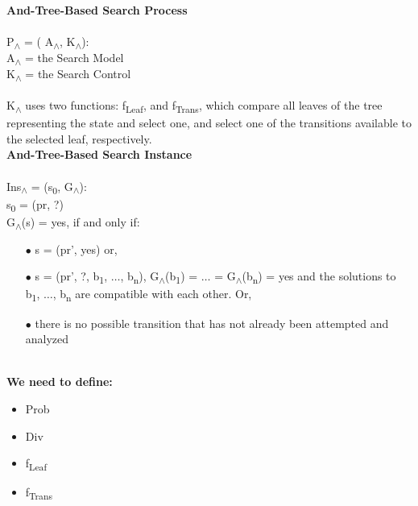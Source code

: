 \documentclass[11pt, oneside]{article}   	%
\begin{document}
\noindent \textbf{And-Tree-Based Search Process}\\\\
P\textsubscript{$\land$} = ( A\textsubscript{$\land$}, K\textsubscript{$\land$}):\\
\indent A\textsubscript{$\land$} = the Search Model\\
\indent K\textsubscript{$\land$} = the Search Control\\\\
\noindent K\textsubscript{$\land$} uses two functions: f\textsubscript{Leaf}, and f\textsubscript{Trans}, which compare all leaves of the tree representing the state and select one, and select one of the transitions available to the selected leaf, respectively.\\

\noindent \textbf{And-Tree-Based Search Instance}\\\\
Ins\textsubscript{$\land$} = (s\textsubscript{0}, G\textsubscript{$\land$}):\\
\indent s\textsubscript{0} = (pr, ?)\\
\indent G\textsubscript{$\land$}(s) = yes, if and only if:
\begin{enumerate}[leftmargin=25mm,topsep=0pt]
\item[$\bullet$] s = (pr', yes) or,
\item[$\bullet$] s = (pr', ?, b\textsubscript{1}, $\ldots$, b\textsubscript{n}), G\textsubscript{$\land$}(b\textsubscript{1}) = $\ldots$ = G\textsubscript{$\land$}(b\textsubscript{n}) = yes and the solutions to b\textsubscript{1}, $\ldots$, b\textsubscript{n} are compatible with each other. Or,
\item[$\bullet$] there is no possible transition that has not already been attempted and analyzed
\end{enumerate}

\noindent \textbf{\\We need to define:}
\begin{itemize}[topsep=0pt]
\item Prob
\item Div
\item f\textsubscript{Leaf}
\item f\textsubscript{Trans}
\end{itemize}
\end{document}
